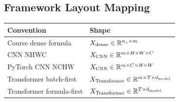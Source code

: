 \subsection{Framework Layout Mapping}

\begin{center}
\begin{tabular}{ll}
\toprule
Convention & Shape \\
\midrule
Course dense formula & $X_{\mathrm{dense}}\in\mathbb{R}^{n_x \times m}$ \\
CNN NHWC & $X_{\mathrm{CNN}}\in\mathbb{R}^{m \times H \times W \times C}$ \\
PyTorch CNN NCHW & $X_{\mathrm{CNN}}\in\mathbb{R}^{m \times C \times H \times W}$ \\
Transformer batch-first & $X_{\mathrm{Transformer}}\in\mathbb{R}^{m \times T \times d_{\mathrm{model}}}$ \\
Transformer formula-first & $X_{\mathrm{Transformer}}\in\mathbb{R}^{T \times d_{\mathrm{model}}}$ \\
\bottomrule
\end{tabular}
\end{center}
